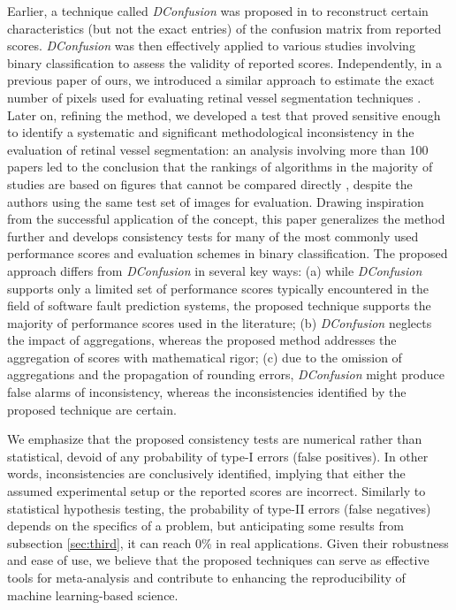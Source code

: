 \documentclass[3p, times]{elsarticle}
\begin{document}
Earlier, a technique called \emph{DConfusion} was proposed in \cite{dconfusion} to reconstruct certain characteristics (but not the exact entries) of the confusion matrix from reported scores. \emph{DConfusion} was then effectively applied to various studies involving binary classification \cite{errorsml} to assess the validity of reported scores.
 Independently, in a previous paper of ours, we introduced a similar approach to estimate the exact number of pixels used for evaluating retinal vessel segmentation techniques \cite{vesselsegm}. Later on, refining the method, we developed a test that proved sensitive enough to identify a systematic and significant methodological inconsistency in the evaluation of retinal vessel segmentation: an analysis involving more than 100 papers led to the conclusion that the rankings of algorithms in the majority of studies are based on figures that cannot be compared directly \cite{vessel}, despite the authors using the same test set of images for evaluation. Drawing inspiration from the successful application of the concept, this paper generalizes the method further and develops consistency tests for many of the most commonly used performance scores and evaluation schemes in binary classification.
 The proposed approach differs from \emph{DConfusion} \cite{dconfusion} in several key ways: (a) while \emph{DConfusion} supports only a limited set of performance scores typically encountered in the field of software fault prediction systems, the proposed technique supports the majority of performance scores used in the literature; (b) \emph{DConfusion} neglects the impact of aggregations, whereas the proposed method addresses the aggregation of scores with mathematical rigor; (c) due to the omission of aggregations and the propagation of rounding errors, \emph{DConfusion} might produce false alarms of inconsistency, whereas the inconsistencies identified by the proposed technique are certain.

We emphasize that the proposed consistency tests are numerical rather than statistical, devoid of any probability of type-I errors (false positives). In other words, inconsistencies are conclusively identified, implying that either the assumed experimental setup or the reported scores are incorrect. 
{\color{blue}
    Similarly to statistical hypothesis testing, the probability of type-II errors (false negatives) depends on the specifics of a problem, but anticipating some results from subsection \ref{sec:third}, it can reach 0\% in real applications.} 
Given their robustness and ease of use, we believe that the proposed techniques can serve as effective tools for meta-analysis and contribute to enhancing the reproducibility of machine learning-based science.
\end{document}
